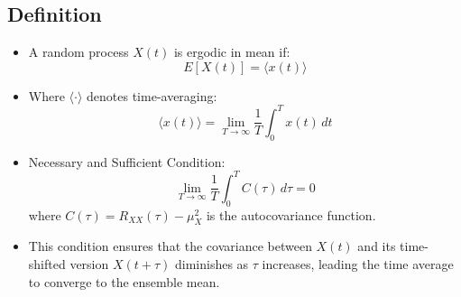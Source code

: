 \documentclass[12pt]{article}
\begin{document}
\subsection{Definition}
\begin{itemize}
    \item A random process \( X(t) \) is ergodic in mean if:
    \[
    E[X(t)] = \langle x(t) \rangle
    \]
    \item Where \( \langle \cdot \rangle \) denotes time-averaging:
    \[
    \langle x(t) \rangle = \lim_{T \to \infty} \frac{1}{T} \int_{0}^{T} x(t) \, dt
    \]
    \item Necessary and Sufficient Condition:
    \[
    \lim_{T \to \infty} \frac{1}{T} \int_{0}^{T} C(\tau) \, d\tau = 0
    \]
    where \( C(\tau) = R_{XX}(\tau) - \mu_X^2 \) is the autocovariance function.
    \item This condition ensures that the covariance between \( X(t) \) and its time-shifted version \( X(t+\tau) \) diminishes as \( \tau \) increases, leading the time average to converge to the ensemble mean.
\end{itemize}
\end{document}
